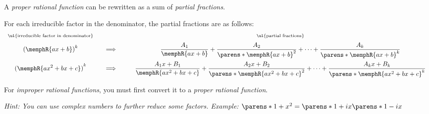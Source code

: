 \begin{CheatsheetEntryFrame}


    A \textit{proper rational function} can be rewritten as a sum of \textit{partial fractions}.

    For each irreducible factor in the denominator, the partial fractions are as follows:
    \renewcommand{\W}{\displaystyle}
    \begin{equation*}
        \begin{array}{ccccc}
            \substack{\text{\ul{irreducible factor in denominator}}} &&&&
                \substack{\text{\ul{partial fractions}}}
                \\[1ex]
            \W {(\memphR{ax + b})}^k &
                & \Longrightarrow & \quad &
                \W \frac{A_1}{\memphR{ax + b}}
                + \frac{A_2}{\parens*{\memphR{ax + b}}^2}
                + \dots
                + \frac{A_k}{\parens*{\memphR{ax + b}}^k}
                \\[3ex]
            \W {(\memphR{ax^2 + bx + c})}^k &
                & \Longrightarrow & \quad &
                \W \frac{A_1 x + B_1}{\memphR{ax^2 + bx + c}}
                + \frac{A_2 x + B_2}{\parens*{\memphR{ax^2 + bx + c}}^2}
                + \dots
                + \frac{A_k x + B_k}{\parens*{\memphR{ax^2 + bx + c}}^k}
        \end{array}
    \end{equation*}

    For \emph{improper rational functions}, you must first convert it to a \emph{proper rational function}.

    \emph{Hint: You can use complex numbers to further reduce some factors. Example: $\parens*{1 + x^2} = \parens*{1 + i x} \parens*{1 - i x}$}

\end{CheatsheetEntryFrame}

\begin{multicols}{2}

    \begin{CheatsheetEntryFrame}


    \end{CheatsheetEntryFrame}

    \MulticolsBreak

    \MulticolsPhantomPlaceholder

\end{multicols}

